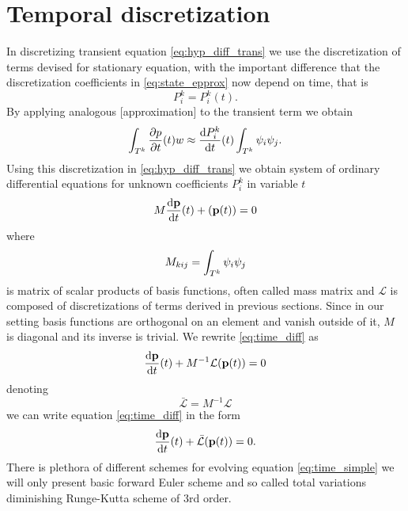 \newpage
\section{Temporal discretization}
\label{se:time_theory}
%
In discretizing transient equation \eqref{eq:hyp_diff_trans} we use the 
discretization of terms devised for stationary equation, with the important 
difference that the discretization coefficients in \eqref{eq:state_epprox} now 
depend on time, that is
\begin{equation}
	P^k_i = P^k_i(t).
\end{equation}
By applying analogous [approximation] to the transient term we obtain
\begin{equation}
	\int_{T^k}\frac{\partial p}{\partial t}(t)w \approx  \frac{\text{d}P^k_i}{\text{d}t}(t)\int_{T^k}\psi_i\psi_j. 
\end{equation}
Using this discretization in \eqref{eq:hyp_diff_trans} we obtain system of 
ordinary differential equations for unknown coefficients 
$P^k_i$ in variable $t$
\begin{equation}\label{eq:time_diff}
	M \frac{\text{d}\mathbf{p}}{\text{d}t}(t) +(\mathbf{p}(t)) = 0
\end{equation}
where 
\begin{equation}
	M_{kij} = \int_{T^k}\psi_i\psi_j
\end{equation}
is matrix of scalar products of basis functions, often called mass matrix and  
$\mathcal{L}$  is composed of discretizations of terms derived in previous sections.
Since in our setting basis functions are orthogonal on an element and vanish 
outside of it, $M$ is diagonal and its inverse is trivial. We rewrite  
\eqref{eq:time_diff} as
\begin{equation}
	 \frac{\text{d}\mathbf{p}}{\text{d}t}(t) + M^{-1}\mathcal{L}(\mathbf{p}(t)) = 0
\end{equation}
denoting
\begin{equation}
	\bar{\mathcal{L}} = M^{-1}\mathcal{L} 
\end{equation}
we can write equation 
\eqref{eq:time_diff} in the form
\begin{equation}\label{eq:time_simple}
\frac{\text{d}\mathbf{p}}{\text{d}t}(t) + \bar{\mathcal{L}}(\mathbf{p}(t)) = 0.
\end{equation}
There is plethora of different schemes for evolving equation 
\eqref{eq:time_simple} we will only present basic forward Euler scheme and so called 
total variations diminishing Runge-Kutta scheme of 3rd order.


